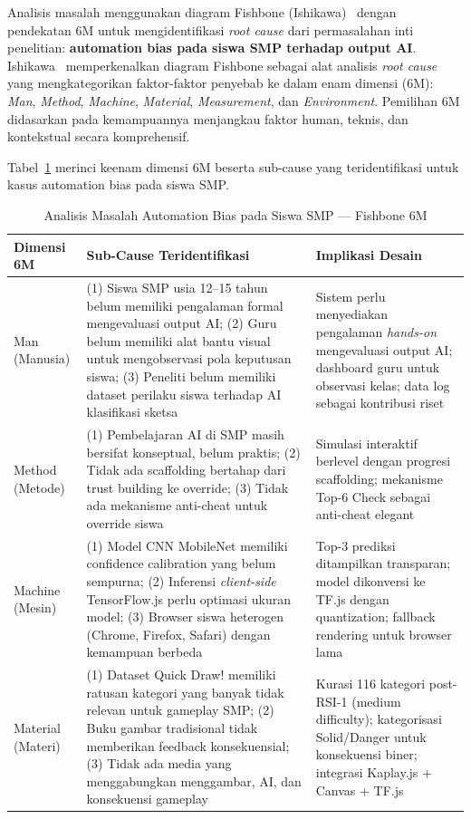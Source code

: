 \documentclass[12pt,a4paper,oneside,openany]{report}
\begin{document}
Analisis masalah menggunakan diagram Fishbone (Ishikawa)~\cite{ref14} dengan pendekatan 6M untuk mengidentifikasi \textit{root cause} dari permasalahan inti penelitian: \textbf{automation bias pada siswa SMP terhadap output AI}. Ishikawa~\cite{ref14} memperkenalkan diagram Fishbone sebagai alat analisis \textit{root cause} yang mengkategorikan faktor-faktor penyebab ke dalam enam dimensi (6M): \textit{Man}, \textit{Method}, \textit{Machine}, \textit{Material}, \textit{Measurement}, dan \textit{Environment}. Pemilihan 6M didasarkan pada kemampuannya menjangkau faktor human, teknis, dan kontekstual secara komprehensif.

Tabel~\ref{tab:fishbone-6m} merinci keenam dimensi 6M beserta sub-cause yang teridentifikasi untuk kasus automation bias pada siswa SMP.

\begin{table}[H]
\centering
\caption{Analisis Masalah Automation Bias pada Siswa SMP --- Fishbone 6M}
\label{tab:fishbone-6m}
\begin{tabular}{|p{2.5cm}|p{5cm}|p{6cm}|}
\hline
\textbf{Dimensi 6M} & \textbf{Sub-Cause Teridentifikasi} & \textbf{Implikasi Desain} \\ \hline
Man (Manusia) & (1) Siswa SMP usia 12--15 tahun belum memiliki pengalaman formal mengevaluasi output AI; (2) Guru belum memiliki alat bantu visual untuk mengobservasi pola keputusan siswa; (3) Peneliti belum memiliki dataset perilaku siswa terhadap AI klasifikasi sketsa & Sistem perlu menyediakan pengalaman \textit{hands-on} mengevaluasi output AI; dashboard guru untuk observasi kelas; data log sebagai kontribusi riset \\ \hline
Method (Metode) & (1) Pembelajaran AI di SMP masih bersifat konseptual, belum praktis; (2) Tidak ada scaffolding bertahap dari trust building ke override; (3) Tidak ada mekanisme anti-cheat untuk override siswa & Simulasi interaktif berlevel dengan progresi scaffolding; mekanisme Top-6 Check sebagai anti-cheat elegant \\ \hline
Machine (Mesin) & (1) Model CNN MobileNet memiliki confidence calibration yang belum sempurna; (2) Inferensi \textit{client-side} TensorFlow.js perlu optimasi ukuran model; (3) Browser siswa heterogen (Chrome, Firefox, Safari) dengan kemampuan berbeda & Top-3 prediksi ditampilkan transparan; model dikonversi ke TF.js dengan quantization; fallback rendering untuk browser lama \\ \hline
Material (Materi) & (1) Dataset Quick Draw! memiliki ratusan kategori yang banyak tidak relevan untuk gameplay SMP; (2) Buku gambar tradisional tidak memberikan feedback konsekuensial; (3) Tidak ada media yang menggabungkan menggambar, AI, dan konsekuensi gameplay & Kurasi 116 kategori post-RSI-1 (medium difficulty); kategorisasi Solid/Danger untuk konsekuensi biner; integrasi Kaplay.js + Canvas + TF.js \\ \hline

\end{tabular}
\end{table}
\end{document}
